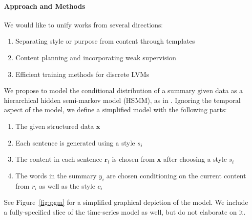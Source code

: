 \documentclass[11pt]{article}
\newcommand{\Cat}{\mathrm{Cat}}
\newcommand\Unif{\mathrm{Unif}}
\newcommand{\br}{\mathbf{r}}
\newcommand{\bx}{\mathbf{x}}
\begin{document}
\paragraph{Approach and Methods}
We would like to unify works from several directions:
\begin{enumerate}
\item Separating style or purpose from content through templates
\citep{sauper2009wiki,wiseman2018template}
\item Content planning and incorporating weak supervision
\citep{puduppully2018contentselection}
\item Efficient training methods for discrete LVMs \citep{deng2018vattn}
\end{enumerate}
We propose to model the conditional distribution of a summary given data as a 
hierarchical hidden semi-markov model (HSMM), as in \citep{liang2009semalign}.
Ignoring the temporal aspect of the model, we define a simplified model
with the following parts:
\begin{enumerate}
\item The given structured data $\bx$ 
\item Each sentence is generated using a style $s_i$
\item The content in each sentence $\br_i$ is chosen from $\bx$
after choosing a style $s_i$
\item The words in the summary $y_i$ are chosen conditioning on
the current content from $r_i$ as well as the style $c_i$
\end{enumerate}
\begin{comment}
We also present a more detailed model:
\begin{enumerate}
\item The style features $s_t\mid y_{t-1},s_{t-1},\bx\sim\Cat()$
\item The record choices $r_t\mid r_{t-1}^D,r_{t-1},s_t,\bx\sim\Cat()$
\item The record duration is given by 
$r_t^D\mid r_{t-1}^D=0,r_t\sim\Unif(1,\ldots,L)$
where $L$ is the max segment length and $r_t^D\mid r_{t-1}^D=x = x-1$

\item The words in the summary $y_t\mid y_{<t},r_t,s_t\sim\Cat()$
\end{enumerate}
\end{comment}
See Figure~\ref{fig:pgm} for a simplified graphical depiction of the model.
We include a fully-specified slice of the time-series model as well,
but do not elaborate on it.
\end{document}
